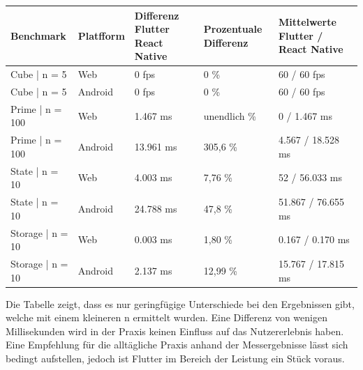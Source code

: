 \begin{table}[h!]
    \centering
    \begin{tabular}{|l|l|p{3cm}|p{3cm}|p{4cm}|}
    \toprule
    \textbf{Benchmark} & \textbf{Platfform}  & \textbf{Differenz Flutter React Native} & \textbf{Prozentuale Differenz} & \textbf{Mittelwerte Flutter / React Native} \\
    \midrule
    Cube | n = 5   & Web   & 0 fps & 0 \%  & 60 / 60 fps     \\
    Cube | n = 5   & Android   & 0 fps & 0 \% & 60 / 60 fps    \\
    Prime | n = 100      & Web   & 1.467 ms & unendlich \% & 0 / 1.467 ms   \\
    Prime | n = 100      & Android   & 13.961 ms & 305,6 \% & 4.567 / 18.528 ms    \\
    State | n = 10      & Web   & 4.003 ms & 7,76 \% & 52 / 56.033 ms  \\
    State | n = 10      & Android   & 24.788 ms & 47,8 \% & 51.867 / 76.655 ms   \\
    Storage | n = 10    & Web   & 0.003 ms & 1,80 \% & 0.167 / 0.170 ms \\
    Storage | n = 10    & Android   & 2.137 ms & 12,99 \% & 15.767 / 17.815 ms \\
    \bottomrule
    \end{tabular}
\end{table}

Die Tabelle zeigt, dass es nur geringfügige Unterschiede bei den Ergebnissen gibt, welche mit einem kleineren n ermittelt wurden. Eine Differenz von wenigen Millisekunden wird in der Praxis keinen Einfluss auf das Nutzererlebnis haben. Eine Empfehlung für die alltägliche Praxis anhand der Messergebnisse lässt sich bedingt aufstellen, jedoch ist Flutter im Bereich der Leistung ein Stück voraus.

